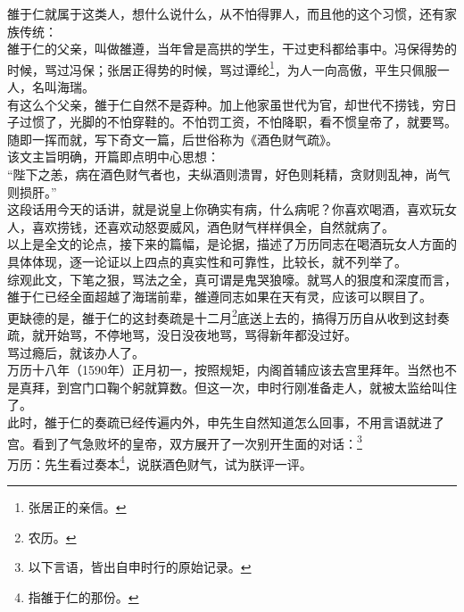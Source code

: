 \begin{multicols}{\theparacolNo}
雒于仁就属于这类人，想什么说什么，从不怕得罪人，而且他的这个习惯，还有家族传统：\\

雒于仁的父亲，叫做雒遵，当年曾是高拱的学生，干过吏科都给事中。冯保得势的时候，骂过冯保；张居正得势的时候，骂过谭纶\footnote{张居正的亲信。}，为人一向高傲，平生只佩服一人，名叫海瑞。\\

有这么个父亲，雒于仁自然不是孬种。加上他家虽世代为官，却世代不捞钱，穷日子过惯了，光脚的不怕穿鞋的。不怕罚工资，不怕降职，看不惯皇帝了，就要骂。随即一挥而就，写下奇文一篇，后世俗称为《酒色财气疏》。\\

该文主旨明确，开篇即点明中心思想：\\

“陛下之恙，病在酒色财气者也，夫纵酒则溃胃，好色则耗精，贪财则乱神，尚气则损肝。”\\

这段话用今天的话讲，就是说皇上你确实有病，什么病呢？你喜欢喝酒，喜欢玩女人，喜欢捞钱，还喜欢动怒耍威风，酒色财气样样俱全，自然就病了。\\

以上是全文的论点，接下来的篇幅，是论据，描述了万历同志在喝酒玩女人方面的具体体现，逐一论证以上四点的真实性和可靠性，比较长，就不列举了。\\

综观此文，下笔之狠，骂法之全，真可谓是鬼哭狼嚎。就骂人的狠度和深度而言，雒于仁已经全面超越了海瑞前辈，雒遵同志如果在天有灵，应该可以瞑目了。\\

更缺德的是，雒于仁的这封奏疏是十二月\footnote{农历。}底送上去的，搞得万历自从收到这封奏疏，就开始骂，不停地骂，没日没夜地骂，骂得新年都没过好。\\

骂过瘾后，就该办人了。\\

万历十八年（1590年）正月初一，按照规矩，内阁首辅应该去宫里拜年。当然也不是真拜，到宫门口鞠个躬就算数。但这一次，申时行刚准备走人，就被太监给叫住了。\\

此时，雒于仁的奏疏已经传遍内外，申先生自然知道怎么回事，不用言语就进了宫。看到了气急败坏的皇帝，双方展开了一次别开生面的对话：\footnote{以下言语，皆出自申时行的原始记录。}\\

万历：先生看过奏本\footnote{指雒于仁的那份。}，说朕酒色财气，试为朕评一评。\\


\end{multicols}
